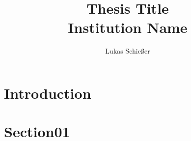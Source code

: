 \documentclass[12pt,twoside]{report}
\title{
{Thesis Title}\\
{\large Institution Name}\\
}
\author{Lukas Schießer}
\date{}
\begin{document}
\maketitle
 
\tableofcontents
\newpage
\chapter{Introduction}

\chapter{Section01}

\end{document}
